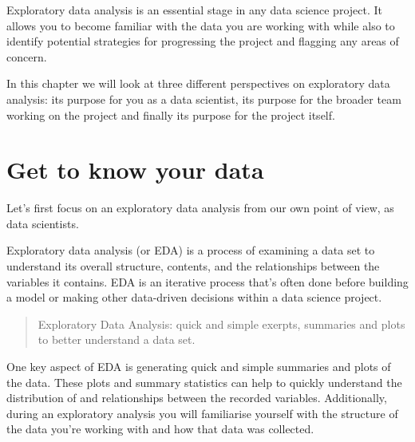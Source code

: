 \documentclass[
  letterpaper,
  DIV=11,
  numbers=noendperiod]{scrreprt}
\begin{document}
Exploratory data analysis is an essential stage in any data science
project. It allows you to become familiar with the data you are working
with while also to identify potential strategies for progressing the
project and flagging any areas of concern.

In this chapter we will look at three different perspectives on
exploratory data analysis: its purpose for you as a data scientist, its
purpose for the broader team working on the project and finally its
purpose for the project itself.

\section{Get to know your data}\label{get-to-know-your-data}

Let's first focus on an exploratory data analysis from our own point of
view, as data scientists.

Exploratory data analysis (or EDA) is a process of examining a data set
to understand its overall structure, contents, and the relationships
between the variables it contains. EDA is an iterative process that's
often done before building a model or making other data-driven decisions
within a data science project.

\begin{quote}
Exploratory Data Analysis: quick and simple exerpts, summaries and plots
to better understand a data set.
\end{quote}

One key aspect of EDA is generating quick and simple summaries and plots
of the data. These plots and summary statistics can help to quickly
understand the distribution of and relationships between the recorded
variables. Additionally, during an exploratory analysis you will
familiarise yourself with the structure of the data you're working with
and how that data was collected.
\end{document}

